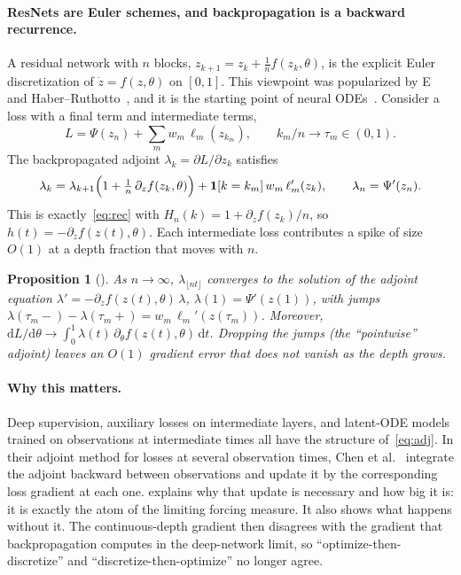 \documentclass[11pt]{article}
\theoremstyle{plain}
\newtheorem{proposition}[theorem]{Proposition}
\theoremstyle{remark}
\newcommand{\dd}{\mathrm{d}}
\begin{document}
\paragraph{ResNets are Euler schemes, and backpropagation is a backward recurrence.}
A residual network with $n$ blocks, $z_{k+1}=z_k+\tfrac1n f(z_k,\theta)$, is the explicit
Euler discretization of $\dot z=f(z,\theta)$ on $[0,1]$. This viewpoint was popularized by
E~\cite{e2017} and Haber--Ruthotto~\cite{haber}, and it is the starting point of neural
ODEs~\cite{chen}. Consider a loss with a final term and intermediate terms,
\[
  L=\Psi(z_n)+\sum_m w_m\,\ell_m(z_{k_m}),\qquad k_m/n\to\tau_m\in(0,1).
\]
The backpropagated adjoint $\lambda_k=\partial L/\partial z_k$ satisfies
\begin{equation}\label{eq:adj}
  \lambda_k=\lambda_{k+1}\Bigl(1+\tfrac1n\,\partial_z f(z_k,\theta)\Bigr)
  +\mathbf 1[k=k_m]\,w_m\,\ell_m'(z_k),\qquad \lambda_n=\Psi'(z_n).
\end{equation}
This is exactly~\eqref{eq:rec} with $H_n(k)=1+\partial_z f(z_k)/n$, so
$h(t)=-\partial_z f(z(t),\theta)$. Each intermediate loss contributes a spike of
size $O(1)$ at a depth fraction that moves with $n$.

\begin{proposition}[{\cite[Proposition~10]{companion}}]\label{prop:resnet}
As $n\to\infty$, $\lambda_{\lfloor nt\rfloor}$ converges to the solution of the adjoint
equation $\lambda'=-\partial_z f(z(t),\theta)\,\lambda$, $\lambda(1)=\Psi'(z(1))$,
\emph{with jumps} $\lambda(\tau_m-)-\lambda(\tau_m+)=w_m\,\ell_m'(z(\tau_m))$. Moreover,
$\dd L/\dd\theta\to\int_0^1\lambda(t)\,\partial_\theta f(z(t),\theta)\,\dd t$. Dropping the
jumps (the ``pointwise'' adjoint) leaves an $O(1)$ gradient error that does not vanish as
the depth grows.
\end{proposition}

\paragraph{Why this matters.}
Deep supervision, auxiliary losses on intermediate layers, and latent-ODE models trained
on observations at intermediate times all have the structure of~\eqref{eq:adj}. In their
adjoint method for losses at several observation times, Chen et al.~\cite{chen} integrate
the adjoint backward between observations and update it by the corresponding loss
gradient at each one.  explains why that update is necessary and how big
it is: it is exactly the atom of the limiting forcing measure. It also shows what happens
without it. The continuous-depth gradient then disagrees with the gradient that
backpropagation computes in the deep-network limit, so ``optimize-then-discretize'' and
``discretize-then-optimize'' no longer agree.
\end{document}
